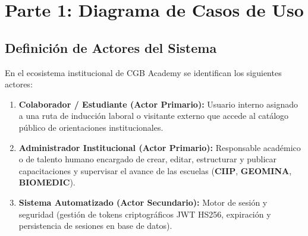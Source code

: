 \documentclass[11pt,a4paper]{article}
\begin{document}
\section{Parte 1: Diagrama de Casos de Uso}

\subsection{Definición de Actores del Sistema}
En el ecosistema institucional de CGB Academy se identifican los siguientes actores:
\begin{enumerate}[leftmargin=*]
    \item \textbf{Colaborador / Estudiante (Actor Primario):} Usuario interno asignado a una ruta de inducción laboral o visitante externo que accede al catálogo público de orientaciones institucionales.
    \item \textbf{Administrador Institucional (Actor Primario):} Responsable académico o de talento humano encargado de crear, editar, estructurar y publicar capacitaciones y supervisar el avance de las escuelas (\textbf{CIIP}, \textbf{GEOMINA}, \textbf{BIOMEDIC}).
    \item \textbf{Sistema Automatizado (Actor Secundario):} Motor de sesión y seguridad (gestión de tokens criptográficos JWT HS256, expiración y persistencia de sesiones en base de datos).
\end{enumerate}
\end{document}
